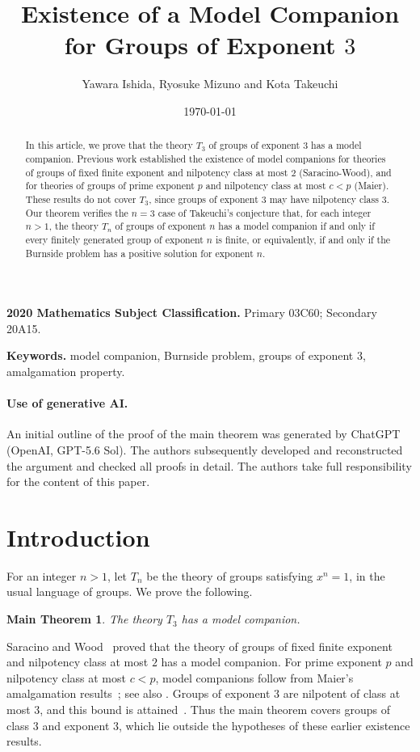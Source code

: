 \documentclass[11pt,reqno]{article}
\title{Existence of a Model Companion for Groups of Exponent $3$}
\author{Yawara Ishida, Ryosuke Mizuno and Kota Takeuchi}
\date{\today}
\newtheorem*{maintheorem*}{Main Theorem}
\theoremstyle{definition}
\theoremstyle{remark}
\begin{document}
\maketitle

\begin{abstract}
In this article, we prove that the theory $T_3$ of groups of exponent $3$ has a model
companion. Previous work established the existence of model companions
for theories of groups of fixed finite exponent and nilpotency class
at most $2$ (Saracino-Wood), and for theories of groups of prime exponent $p$ and
nilpotency class at most $c<p$ (Maier). These results do not cover $T_3$,
since groups of exponent $3$ may have nilpotency class $3$.
Our theorem verifies the $n=3$ case of Takeuchi's conjecture that,
for each integer $n>1$, the theory $T_n$ of groups of exponent $n$
has a model companion if and only if every finitely generated group
of exponent $n$ is finite, or equivalently, if and only if the
Burnside problem has a positive solution for exponent $n$.
\end{abstract}

\medskip
\noindent\textbf{2020 Mathematics Subject Classification.}
Primary 03C60; Secondary 20A15.

\smallskip
\noindent\textbf{Keywords.}
model companion, Burnside problem, groups of exponent $3$, amalgamation property.

\paragraph{Use of generative AI.}
An initial outline of the proof of the main theorem was generated by ChatGPT (OpenAI, GPT-5.6 Sol).
The authors subsequently developed and reconstructed the argument
and checked all proofs in detail.
The authors take full responsibility for the content of this paper.


\section{Introduction}
\label{sec:introduction}

For an integer $n>1$, let $T_n$ be the theory of groups satisfying
$x^n=1$, in the usual language of groups. We prove the following.

\begin{maintheorem*}
The theory $T_3$ has a model companion.
\end{maintheorem*}

Saracino and Wood~\cite{SaracinoWood1979} proved that the theory of
groups of fixed finite exponent and nilpotency class at most $2$ has
a model companion. For prime exponent $p$ and nilpotency class at most
$c<p$, model companions follow from Maier's amalgamation
results~\cite{Maier1989}; see also
\cite[Corollary~4.42]{dElbeeMuellerRamseySiniora2025}.
Groups of exponent $3$ are nilpotent of class at most $3$, and this
bound is attained~\cite{LeviVanDerWaerden1933}. Thus the main theorem
covers groups of class $3$ and exponent $3$, which lie outside the
hypotheses of these earlier existence results.
\end{document}
